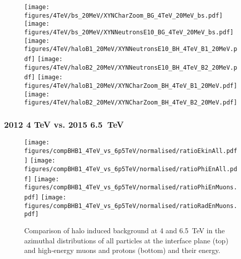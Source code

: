 \begin{figure}
  \begin{center}
    \texttt{[image: figures/4TeV/bs\_20MeV/XYNCharZoom\_BG\_4TeV\_20MeV\_bs.pdf]}
    \texttt{[image: figures/4TeV/bs\_20MeV/XYNNeutronsE10\_BG\_4TeV\_20MeV\_bs.pdf]}
    \texttt{[image: figures/4TeV/haloB1\_20MeV/XYNNeutronsE10\_BH\_4TeV\_B1\_20MeV.pdf]}
    \texttt{[image: figures/4TeV/haloB2\_20MeV/XYNNeutronsE10\_BH\_4TeV\_B2\_20MeV.pdf]}
    \texttt{[image: figures/4TeV/haloB1\_20MeV/XYNCharZoom\_BH\_4TeV\_B1\_20MeV.pdf]}
    \texttt{[image: figures/4TeV/haloB2\_20MeV/XYNCharZoom\_BH\_4TeV\_B2\_20MeV.pdf]}
    
\end{center}
\vspace{-0.6cm}
 \caption{
  \label{fig:XYNPho}}
\end{figure}

\subsubsection{2012 4 TeV vs. 2015 6.5~TeV}
\begin{figure}
\begin{center}
  \texttt{[image: figures/compBHB1\_4TeV\_vs\_6p5TeV/normalised/ratioEkinAll.pdf]}
  \texttt{[image: figures/compBHB1\_4TeV\_vs\_6p5TeV/normalised/ratioPhiEnAll.pdf]}
  \texttt{[image: figures/compBHB1\_4TeV\_vs\_6p5TeV/normalised/ratioPhiEnMuons.pdf]}
  \texttt{[image: figures/compBHB1\_4TeV\_vs\_6p5TeV/normalised/ratioRadEnMuons.pdf]}
\end{center}
\vspace{-0.6cm}
 \caption{Comparison of halo induced background at 4 and 6.5~TeV in the azimuthal distributions of all particles at the interface plane (top) and high-energy muons and protons (bottom) and their energy.
  \label{compBHB1run1run2}}
\end{figure}

